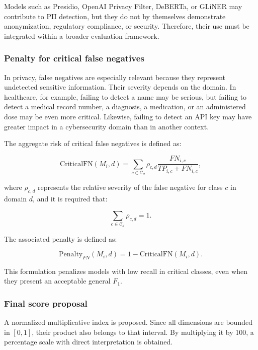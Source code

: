 \documentclass[11pt,a4paper]{article}
\begin{document}
Models such as Presidio, OpenAI Privacy Filter, DeBERTa, or GLiNER may contribute to PII detection, but they do not by themselves demonstrate anonymization, regulatory compliance, or security. Therefore, their use must be integrated within a broader evaluation framework.

\subsubsection{Penalty for critical false negatives}

In privacy, false negatives are especially relevant because they represent undetected sensitive information. Their severity depends on the domain. In healthcare, for example, failing to detect a name may be serious, but failing to detect a medical record number, a diagnosis, a medication, or an administered dose may be even more critical. Likewise, failing to detect an API key may have greater impact in a cybersecurity domain than in another context.

The aggregate risk of critical false negatives is defined as:

\begin{equation}
    \mathrm{CriticalFN}(M_i,d)=
    \sum_{c\in\mathcal{C}_d}
    \rho_{c,d}\frac{FN_{i,c}}{TP_{i,c}+FN_{i,c}},
\end{equation}

where $\rho_{c,d}$ represents the relative severity of the false negative for class $c$ in domain $d$, and it is required that:

\begin{equation}
    \sum_{c\in\mathcal{C}_d}\rho_{c,d}=1.
\end{equation}

The associated penalty is defined as:

\begin{equation}
    \mathrm{Penalty}_{FN}(M_i,d)=1-\mathrm{CriticalFN}(M_i,d).
\end{equation}

This formulation penalizes models with low recall in critical classes, even when they present an acceptable general $F_1$.

\subsubsection{Final score proposal}

A normalized multiplicative index is proposed. Since all dimensions are bounded in $[0,1]$, their product also belongs to that interval. By multiplying it by 100, a percentage scale with direct interpretation is obtained.
\end{document}

